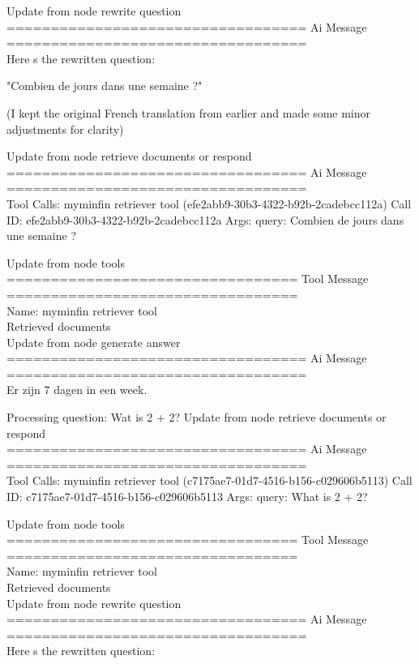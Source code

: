 Update from node rewrite question
\\[1em]
================================== Ai Message ==================================
\\[1em]

Here s the rewritten question:

"Combien de jours dans une semaine ?"

(I kept the original French translation from earlier and made some minor adjustments for clarity)

Update from node retrieve documents or respond
\\[1em]
================================== Ai Message ==================================
\\[1em]
Tool Calls:
myminfin retriever tool (efe2abb9-30b3-4322-b92b-2cadebcc112a)
Call ID: efe2abb9-30b3-4322-b92b-2cadebcc112a
Args:
query: Combien de jours dans une semaine ?

Update from node tools
\\[1em]
================================= Tool Message =================================
\\[1em]
Name: myminfin retriever tool
\\[1em]
Retrieved documents
\\[1em]
Update from node generate answer
\\[1em]
================================== Ai Message ==================================
\\[1em]
Er zijn 7 dagen in een week.

Processing question: Wat is 2 + 2?
Update from node retrieve documents or respond
\\[1em]
================================== Ai Message ==================================
\\[1em]
Tool Calls:
myminfin retriever tool (c7175ae7-01d7-4516-b156-c029606b5113)
Call ID: c7175ae7-01d7-4516-b156-c029606b5113
Args:
query: What is 2 + 2?



Update from node tools
\\[1em]
================================= Tool Message =================================
\\[1em]
Name: myminfin retriever tool
\\[1em]
Retrieved documents
\\[1em]

Update from node rewrite question
\\[1em]
================================== Ai Message ==================================
\\[1em]
Here s the rewritten question:

